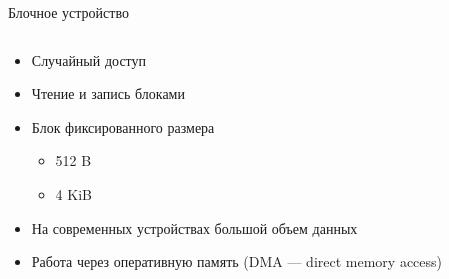 \documentclass[aspectratio=169]{beamer}
\begin{document}
\begin{frame}{Блочное устройство}
\begin{columns}
    \begin{column}{.4\textwidth}
        \begin{itemize}
            \item Случайный доступ
            \item Чтение и запись блоками
            \item Блок фиксированного размера
            \begin{itemize}
                \item 512 B
                \item 4 KiB
            \end{itemize}
            \item На современных устройствах большой объем данных
            \item Работа через оперативную память (DMA --- direct memory access)
        \end{itemize}
    \end{column}
    
    \begin{column}{.3\textwidth}
        \dma
    \end{column}
    

\end{columns}
\end{frame}
\end{document}
